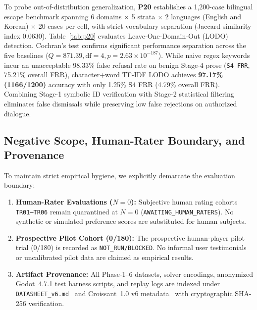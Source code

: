 To probe out-of-distribution generalization, \textbf{P20} establishes a 1,200-case bilingual escape benchmark spanning 6 domains $\times$ 5 strata $\times$ 2 languages (English and Korean) $\times$ 20 cases per cell, with strict vocabulary separation (Jaccard similarity index $0.0630$). Table~\ref{tab:p20} evaluates Leave-One-Domain-Out (LODO) detection. Cochran's test confirms significant performance separation across the five baselines ($Q = 871.39, \text{df}=4, p = 2.63 \times 10^{-187}$). While naive regex keywords incur an unacceptable 98.33\% false refusal rate on benign Stage-4 prose (\texttt{S4 FRR}, 75.21\% overall FRR), character+word TF-IDF LODO achieves \textbf{97.17\% (1166/1200)} accuracy with only 1.25\% S4 FRR (4.79\% overall FRR). Combining Stage-1 symbolic ID verification with Stage-2 statistical filtering eliminates false dismissals while preserving low false rejections on authorized dialogue.

\subsection{Negative Scope, Human-Rater Boundary, and Provenance}\label{sec:kbs-scope}
To maintain strict empirical hygiene, we explicitly demarcate the evaluation boundary:
\begin{enumerate}
\item \textbf{Human-Rater Evaluations ($N{=}0$):} Subjective human rating cohorts \texttt{TR01--TR06} remain quarantined at $N{=}0$ (\texttt{AWAITING\_HUMAN\_RATERS}). No synthetic or simulated preference scores are substituted for human subjects.
\item \textbf{Prospective Pilot Cohort (0/180):} The prospective human-player pilot trial (0/180) is recorded as \texttt{NOT\_RUN/BLOCKED}. No informal user testimonials or uncalibrated pilot data are claimed as empirical results.
\item \textbf{Artifact Provenance:} All Phase-1--6 datasets, solver encodings, anonymized Godot~4.7.1 test harness scripts, and replay logs are indexed under \texttt{DATASHEET\_v6.md}~\cite{gebru2021datasheets} and Croissant~1.0 v6 metadata~\cite{akhtar2024croissant} with cryptographic SHA-256 verification.
\end{enumerate}
